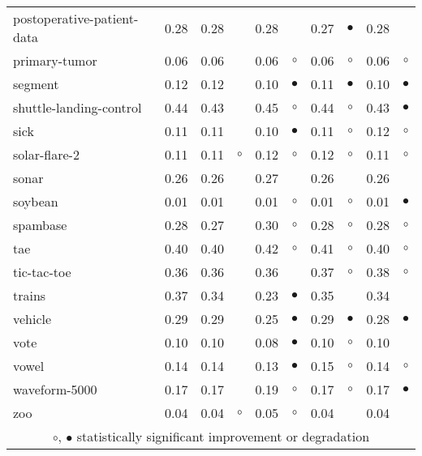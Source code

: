 \begin{table}[thb]
{\begin{tabular}{lrr@{\hspace{0.1cm}}cr@{\hspace{0.1cm}}cr@{\hspace{0.1cm}}cr@{\hspace{0.1cm}}c}
postoperative-patient-data & 0.28 & 0.28 &           & 0.28 &           & 0.27 & $\bullet$ & 0.28 &           \\
primary-tumor & 0.06 & 0.06 &           & 0.06 &   $\circ$ & 0.06 &   $\circ$ & 0.06 &    $\circ$\\
segment & 0.12 & 0.12 &           & 0.10 & $\bullet$ & 0.11 & $\bullet$ & 0.10 &  $\bullet$\\
shuttle-landing-control & 0.44 & 0.43 &           & 0.45 &   $\circ$ & 0.44 &   $\circ$ & 0.43 &  $\bullet$\\
sick & 0.11 & 0.11 &           & 0.10 & $\bullet$ & 0.11 &   $\circ$ & 0.12 &    $\circ$\\
solar-flare-2 & 0.11 & 0.11 &   $\circ$ & 0.12 &   $\circ$ & 0.12 &   $\circ$ & 0.11 &    $\circ$\\
sonar & 0.26 & 0.26 &           & 0.27 &           & 0.26 &           & 0.26 &           \\
soybean & 0.01 & 0.01 &           & 0.01 &   $\circ$ & 0.01 &   $\circ$ & 0.01 &  $\bullet$\\
spambase & 0.28 & 0.27 &           & 0.30 &   $\circ$ & 0.28 &   $\circ$ & 0.28 &    $\circ$\\
tae & 0.40 & 0.40 &           & 0.42 &   $\circ$ & 0.41 &   $\circ$ & 0.40 &    $\circ$\\
tic-tac-toe & 0.36 & 0.36 &           & 0.36 &           & 0.37 &   $\circ$ & 0.38 &    $\circ$\\
trains & 0.37 & 0.34 &           & 0.23 & $\bullet$ & 0.35 &           & 0.34 &           \\
vehicle & 0.29 & 0.29 &           & 0.25 & $\bullet$ & 0.29 & $\bullet$ & 0.28 &  $\bullet$\\
vote & 0.10 & 0.10 &           & 0.08 & $\bullet$ & 0.10 &   $\circ$ & 0.10 &           \\
vowel & 0.14 & 0.14 &           & 0.13 & $\bullet$ & 0.15 &   $\circ$ & 0.14 &    $\circ$\\
waveform-5000 & 0.17 & 0.17 &           & 0.19 &   $\circ$ & 0.17 &   $\circ$ & 0.17 &  $\bullet$\\
zoo & 0.04 & 0.04 &   $\circ$ & 0.05 &   $\circ$ & 0.04 &           & 0.04 &           \\
\hline
\multicolumn{10}{c}{$\circ$, $\bullet$ statistically significant improvement or degradation}\\
\end{tabular} \footnotesize \par}
\end{table}